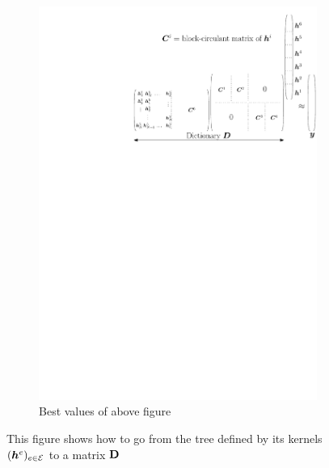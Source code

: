 \begin{figure}[!ht]
\begin{subfigure}[b]{0.69\textwidth}
\includegraphics[width=\textwidth]{figures/pov-matrix.pdf}
\caption{Best values of above figure}
\end{subfigure}
\caption{This figure shows how to go from the tree defined by its kernels $(\bm{h}^e)_{e \in \mathcal E}$ to a matrix $\mathbf{D}$} \label{fig_block_circular}
\end{figure}

